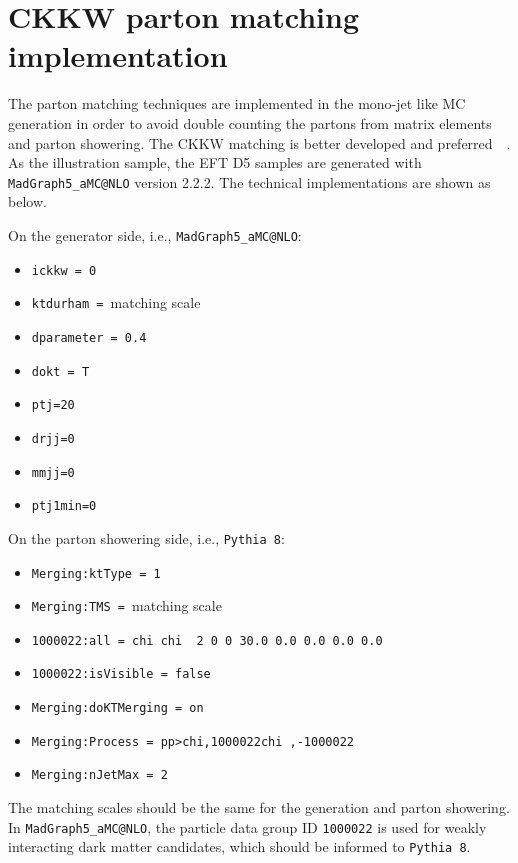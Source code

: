 \section{CKKW parton matching implementation}
\label{sec:monojet_parton_match}

The parton matching techniques are implemented in the mono-jet like MC generation in order to avoid double counting the partons from matrix elements and parton showering. The CKKW matching is better developed and preferred~\cite{Alwall:1405.0301}~\cite{Alwall:0706.2569}. As the illustration sample, the EFT D5 samples are generated with \texttt{MadGraph5\_aMC@NLO} version 2.2.2. The technical implementations are shown as below.

On the generator side, i.e., \texttt{MadGraph5\_aMC@NLO}:
\begin{itemize}
\item \texttt{ickkw = 0}
\item \texttt{ktdurham = }matching scale
\item \texttt{dparameter = 0.4}
\item \texttt{dokt = T}
\item \texttt{ptj=20}
\item \texttt{drjj=0}
\item \texttt{mmjj=0}
\item \texttt{ptj1min=0}
\end{itemize}
On the parton showering side, i.e., \texttt{Pythia 8}:
\begin{itemize}
\item \texttt{Merging:ktType           = 1}
\item \texttt{Merging:TMS              = }matching scale
\item \texttt{1000022:all = chi chi~ 2 0 0 30.0 0.0 0.0 0.0 0.0}
\item \texttt{1000022:isVisible = false}
\item \texttt{Merging:doKTMerging      = on}
\item \texttt{Merging:Process          = pp>{chi,1000022}{chi~,-1000022}}
\item \texttt{Merging:nJetMax          = 2}
\end{itemize}
The matching scales should be the same for the generation and parton showering. In \texttt{MadGraph5\_aMC@NLO}, the particle data group ID \texttt{1000022} is used for weakly interacting dark matter candidates, which should be informed to \texttt{Pythia 8}. 


